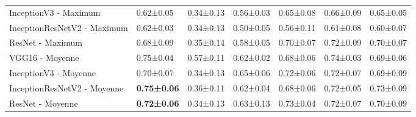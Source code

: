 \begin{landscape}
\begin{table}[]
\begin{tabular}{lllllll}
InceptionV3  - Maximum        & 0.62±0.05          & 0.34±0.13          & 0.56±0.03         & 0.65±0.08         & 0.66±0.09             & 0.65±0.05 \\
InceptionResNetV2  - Maximum  & 0.62±0.03          & 0.34±0.13          & 0.50±0.05         & 0.56±0.11         & 0.61±0.08             & 0.60±0.07 \\
ResNet - Maximum              & 0.68±0.09          & 0.35±0.14          & 0.58±0.05         & 0.70±0.07         & 0.72±0.09             & 0.70±0.07 \\
VGG16 - Moyenne               & 0.75±0.04          & 0.57±0.11          & 0.62±0.02         & 0.68±0.06         & 0.74±0.03             & 0.69±0.06 \\
InceptionV3 - Moyenne         & 0.70±0.07          & 0.34±0.13          & 0.65±0.06         & 0.72±0.06         & 0.72±0.07             & 0.69±0.09 \\
InceptionResNetV2 - Moyenne   & \textbf{0.75±0.06} & 0.36±0.11          & 0.62±0.04         & 0.68±0.06         & 0.72±0.05             & 0.73±0.09 \\
\rowcolor[HTML]{E7E6E6} 
ResNet - Moyenne              & \textbf{0.72±0.06} & 0.34±0.13          & 0.63±0.13         & 0.73±0.04         & 0.72±0.07             & 0.70±0.09
\end{tabular}
\label{tab:image_classification_ss}
\end{table}
\end{landscape}


